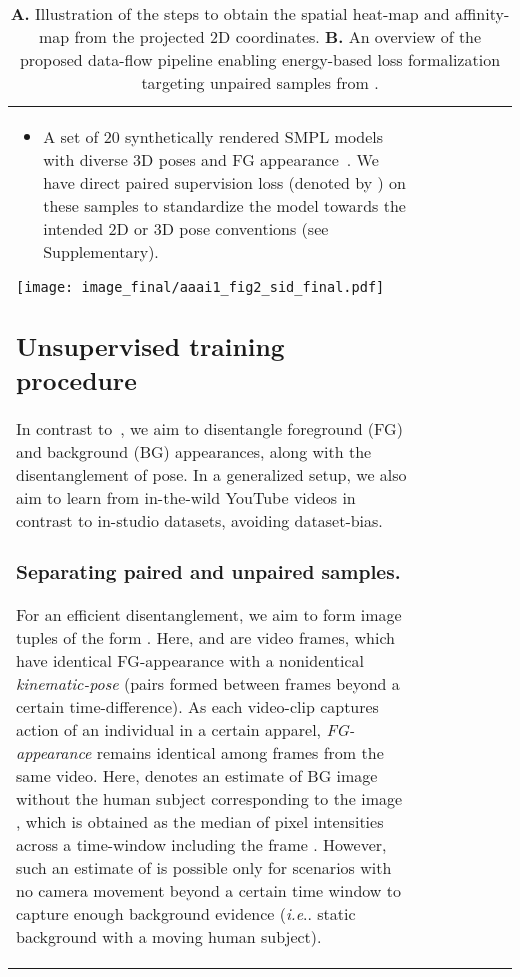 \documentclass[letterpaper]{article} \usepackage{aaai20}  \usepackage{times}  \usepackage{helvet}  \usepackage{courier}  \usepackage{url}  \usepackage{graphicx}  \usepackage{amsmath}
\makeatletter
\DeclareRobustCommand\onedot{\futurelet\@let@token\@onedot}
\def\@onedot{\ifx\@let@token.\else.\null\fi\xspace}
\def\ie{\emph{i.e}\onedot} \def\Ie{\emph{I.e}\onedot}
\makeatother
\begin{document}
\begin{table}[t]
{\begin{tabular}{l|ccc|cc|c}
{{\begin{itemize}[leftmargin=0.35cm]
\item A set of 20 synthetically rendered SMPL models with diverse 3D poses and FG appearance~\cite{varol2017learning}. We have direct paired supervision loss (denoted by ) on these samples to standardize the model towards the intended 2D or 3D pose conventions (see Supplementary).
\end{itemize}


\begin{figure*}\begin{center}
	\texttt{[image: image\_final/aaai1\_fig2\_sid\_final.pdf]}
	\caption{\textbf{A.} Illustration of the steps to obtain the spatial heat-map and affinity-map from the projected 2D coordinates. \textbf{B.} An overview of the proposed data-flow pipeline enabling energy-based loss formalization targeting unpaired samples from .
	}
 	\label{fig:main2}    
    \vspace{-4mm}
\end{center}
\end{figure*}




\subsection{Unsupervised training procedure}
In contrast to~\cite{jakab2018unsupervised}, we aim to disentangle foreground (FG) and background (BG) appearances, along with the disentanglement of pose. In a generalized setup, we also aim to learn from in-the-wild YouTube videos in contrast to in-studio datasets, avoiding dataset-bias. 

\subsubsection{Separating paired and unpaired samples.}


For an efficient disentanglement, we aim to form image tuples of the form . Here,  and  are video frames, which have identical FG-appearance with a nonidentical \textit{kinematic-pose} (pairs formed between frames beyond a certain time-difference). As each video-clip captures action of an individual in a certain apparel, \textit{FG-appearance} remains identical among frames from the same video. Here,  denotes an estimate of BG image without the human subject corresponding to the image , which is obtained as the median of pixel intensities across a time-window including the frame . However, such an estimate of  is possible only for scenarios with no camera movement beyond a certain time window to capture enough background evidence (\ie static background with a moving human subject).

}}
\end{tabular}}
\end{table}
\end{document}
